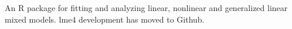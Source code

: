 
An R package for fitting and analyzing linear, nonlinear and generalized linear mixed models. 
lme4 development has moved to Github.


